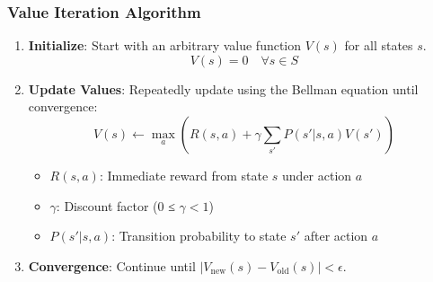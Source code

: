 \documentclass[aspectratio=169]{beamer}
\begin{document}
\begin{frame}[fragile]
    \frametitle{Value Iteration Algorithm}
    \begin{enumerate}
        \item \textbf{Initialize}: Start with an arbitrary value function \( V(s) \) for all states \( s \).
        \[
        V(s) = 0 \quad \forall s \in S
        \]

        \item \textbf{Update Values}: Repeatedly update using the Bellman equation until convergence:
        \[
        V(s) \leftarrow \max_a \left( R(s, a) + \gamma \sum_{s'} P(s'|s, a) V(s') \right)
        \]
        \begin{itemize}
            \item \( R(s, a) \): Immediate reward from state \( s \) under action \( a \)
            \item \( \gamma \): Discount factor (0 ≤ \( \gamma < 1 \))
            \item \( P(s'|s, a) \): Transition probability to state \( s' \) after action \( a \)
        \end{itemize}

        \item \textbf{Convergence}: Continue until \( |V_{\text{new}}(s) - V_{\text{old}}(s)| < \epsilon \).
    \end{enumerate}
\end{frame}
\end{document}
